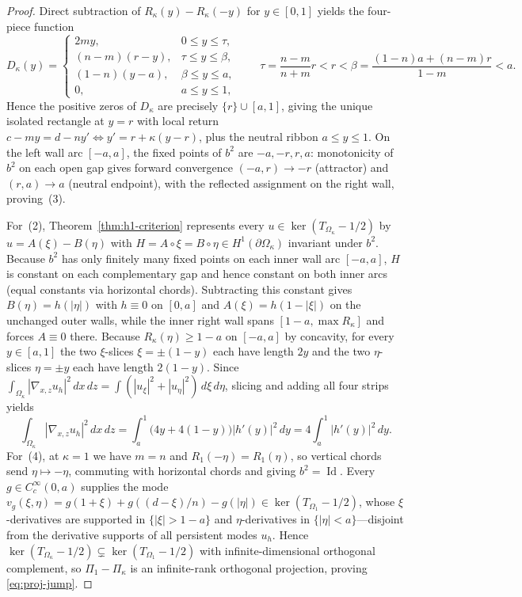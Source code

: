 \documentclass[11pt,reqno]{amsart}
\theoremstyle{definition}
\theoremstyle{remark}
\DeclareMathOperator{\Id}{Id}
\begin{document}
\begin{proof}
Direct subtraction of $R_\kappa(y) - R_\kappa(-y)$ for $y \in [0,1]$ yields the four-piece function
\[
  D_\kappa(y) =
  \begin{cases}
    2my, & 0 \le y \le \tau, \\
    (n-m)(r-y), & \tau \le y \le \beta, \\
    (1-n)(y-a), & \beta \le y \le a, \\
    0, & a \le y \le 1,
  \end{cases}
  \qquad \tau = \frac{n-m}{n+m}r < r < \beta = \frac{(1-n)a + (n-m)r}{1-m} < a.
\]
Hence the positive zeros of $D_\kappa$ are precisely $\{r\} \cup [a, 1]$, giving the unique isolated rectangle at $y = r$ with local return $c - my = d - ny' \iff y' = r + \kappa(y-r)$, plus the neutral ribbon $a \le y \le 1$. On the left wall arc $[-a, a]$, the fixed points of $b^2$ are $-a, -r, r, a$: monotonicity of $b^2$ on each open gap gives forward convergence $(-a, r) \to -r$ (attractor) and $(r, a) \to a$ (neutral endpoint), with the reflected assignment on the right wall, proving~(3).

For~(2), Theorem~\ref{thm:h1-criterion} represents every $u \in \ker(T_{\Omega_\kappa} - 1/2)$ by $u = A(\xi) - B(\eta)$ with $H = A \circ \xi = B \circ \eta \in H^1(\partial\Omega_\kappa)$ invariant under $b^2$. Because $b^2$ has only finitely many fixed points on each inner wall arc $[-a, a]$, $H$ is constant on each complementary gap and hence constant on both inner arcs (equal constants via horizontal chords). Subtracting this constant gives $B(\eta) = h(|\eta|)$ with $h \equiv 0$ on $[0,a]$ and $A(\xi) = h(1 - |\xi|)$ on the unchanged outer walls, while the inner right wall spans $[1-a, \max R_\kappa]$ and forces $A \equiv 0$ there. Because $R_\kappa(\eta) \ge 1-a$ on $[-a, a]$ by concavity, for every $y \in [a,1]$ the two $\xi$-slices $\xi = \pm(1-y)$ each have length $2y$ and the two $\eta$-slices $\eta = \pm y$ each have length $2(1-y)$. Since $\int_{\Omega_\kappa} |\nabla_{x,z} u_h|^2 \, dx\,dz = \int (|u_\xi|^2 + |u_\eta|^2)\,d\xi\,d\eta$, slicing and adding all four strips yields
\[
  \int_{\Omega_\kappa} |\nabla_{x,z} u_h|^2 \, dx\,dz = \int_a^1 \bigl(4y + 4(1-y)\bigr)|h'(y)|^2 \, dy = 4 \int_a^1 |h'(y)|^2 \, dy.
\]
For~(4), at $\kappa = 1$ we have $m = n$ and $R_1(-\eta) = R_1(\eta)$, so vertical chords send $\eta \mapsto -\eta$, commuting with horizontal chords and giving $b^2 = \Id$. Every $g \in C_c^\infty(0,a)$ supplies the mode $v_g(\xi,\eta) = g(1+\xi) + g((d-\xi)/n) - g(|\eta|) \in \ker(T_{\Omega_1} - 1/2)$, whose $\xi$-derivatives are supported in $\{|\xi| > 1-a\}$ and $\eta$-derivatives in $\{|\eta| < a\}$---disjoint from the derivative supports of all persistent modes $u_h$. Hence $\ker(T_{\Omega_\kappa} - 1/2) \subsetneq \ker(T_{\Omega_1} - 1/2)$ with infinite-dimensional orthogonal complement, so $\Pi_1 - \Pi_\kappa$ is an infinite-rank orthogonal projection, proving \eqref{eq:proj-jump}.
\end{proof}
\end{document}
